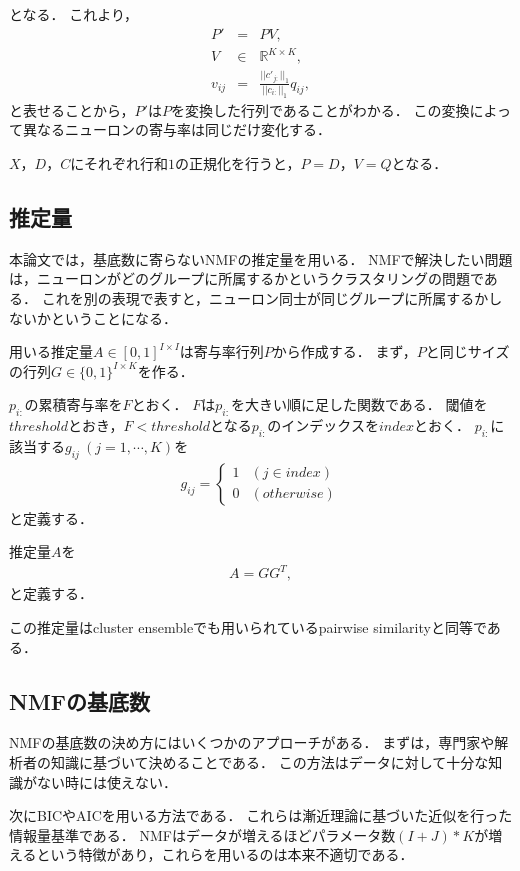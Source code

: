 となる．
これより，
\begin{eqnarray}
	P' &=& PV, \\
	V &\in& \mathbb{R}^{K \times K}, \\
	v_{ij} &=& \frac{ || c'_{j:} ||_1 }{|| c_{i:} ||_1} q_{ij},
\end{eqnarray}
と表せることから，$P'$は$P$を変換した行列であることがわかる．
この変換によって異なるニューロンの寄与率は同じだけ変化する．

$X$，$D$，$C$にそれぞれ行和$1$の正規化を行うと，$P = D$，$V = Q$となる．

\subsection{推定量}
本論文では，基底数に寄らないNMFの推定量を用いる．
NMFで解決したい問題は，ニューロンがどのグループに所属するかというクラスタリングの問題である．
これを別の表現で表すと，ニューロン同士が同じグループに所属するかしないかということになる．

用いる推定量$A \in [0, 1]^{I \times I}$は寄与率行列$P$から作成する．
まず，$P$と同じサイズの行列$G \in \{0, 1\}^{I \times K}$を作る．

$p_{i:}$の累積寄与率を$F$とおく．
$F$は$p_{i:}$を大きい順に足した関数である．
閾値を$threshold$とおき，$F < threshold$となる$p_{i:}$のインデックスを$index$とおく．
$p_{i:}$に該当する$g_{ij} \ (j = 1, \cdots, K)$を
\begin{eqnarray}
	g_{ij} = \begin{cases}
		1 & (j \in index) \\
		0 & (otherwise)
	\end{cases}
\end{eqnarray}
と定義する．

推定量$A$を
\begin{eqnarray}
	A = G G^T,
\end{eqnarray}
と定義する．

この推定量はcluster ensembleでも用いられているpairwise similarity\cite{Boongoen2018}と同等である．

\subsection{NMFの基底数}
NMFの基底数の決め方にはいくつかのアプローチがある．
まずは，専門家や解析者の知識に基づいて決めることである．
この方法はデータに対して十分な知識がない時には使えない．

次にBIC\cite{wasserman2000a}やAIC\cite{Akaike1974}を用いる方法である．
これらは漸近理論に基づいた近似を行った情報量基準である．
NMFはデータが増えるほどパラメータ数$(I + J) * K$が増えるという特徴があり，これらを用いるのは本来不適切である．

